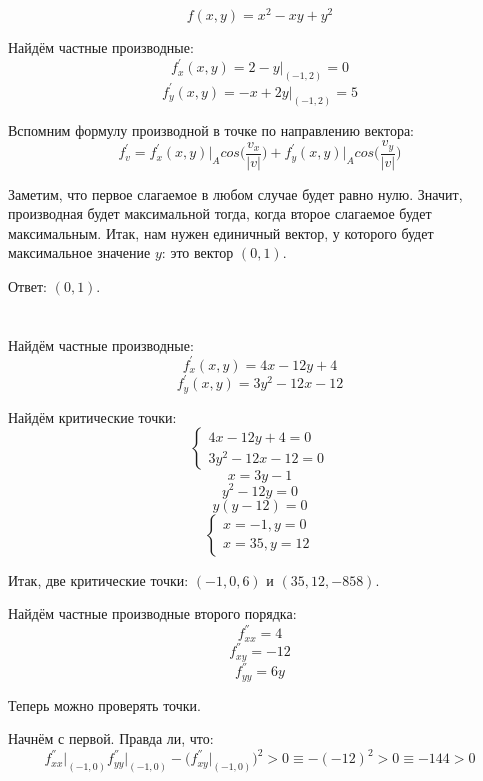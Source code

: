 \documentclass[a4paper,10pt]{article}
\begin{document}
\section{}

$$ f(x, y) = x^2 − xy + y^2 $$

Найдём частные производные:
$$ f^{'}_x(x, y) = 2 - y \big|_{(-1, 2)} = 0 $$
$$ f^{'}_y(x, y) = -x + 2y \big|_{(-1, 2)} = 5 $$

Вспомним формулу производной в точке по направлению вектора:
$$
f^{'}_v = f^{'}_x(x, y)\big|_{A} 
cos\bigg(\frac{v_x}{|v|}\bigg)
+ f^{'}_y(x, y)\big|_{A}
cos\bigg(\frac{v_y}{|v|}\bigg)
$$

Заметим, что первое слагаемое в любом случае будет равно нулю. Значит, производная будет максимальной тогда, когда второе слагаемое будет максимальным. Итак, нам нужен единичный вектор, у которого будет максимальное значение $y$: это вектор $(0, 1)$.

Ответ: $(0, 1)$.

\section{}

Найдём частные производные:
$$ f^{'}_x(x, y) = 4x - 12y + 4 $$
$$ f^{'}_y(x, y) = 3y^2 - 12x - 12 $$

Найдём критические точки:
\begin{equation*}
 \begin{cases}
  4x - 12y + 4 = 0
  \\
  3y^2 - 12x - 12 = 0
 \end{cases}
\end{equation*}
$$ x = 3y - 1 $$
$$ y^2 - 12y = 0 $$
$$ y(y - 12) = 0 $$
\begin{equation*}
 \begin{cases}
  x = -1, y = 0
  \\
  x = 35, y = 12
 \end{cases}
\end{equation*}

Итак, две критические точки: $(-1, 0, 6)$ и $(35, 12, -858)$.

Найдём частные производные второго порядка:
$$ f^{''}_{xx} = 4 $$
$$ f^{''}_{xy} = -12 $$
$$ f^{''}_{yy} = 6y $$

Теперь можно проверять точки.

Начнём с первой. Правда ли, что:
$$
f^{''}_{xx}\big|_{(-1, 0)}
f^{''}_{yy}\big|_{(-1, 0)}
- \big(f^{''}_{xy}\big|_{(-1, 0)}\big)^2
> 0
\equiv
-(-12)^2 > 0
\equiv
-144 > 0
$$
\end{document}
